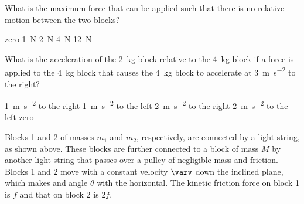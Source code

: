 \documentclass{../../../oss-ap12ibhl}
\begin{document}
\begin{questions}
  \question What is the maximum force that can be applied such that there is no
  relative motion between the two blocks?
  \begin{choices}
    \choice zero
    \choice\SI{1}{\newton}
    \choice\SI{2}{\newton}
    \choice\SI{4}{\newton}
    \choice\SI{12}{\newton}
  \end{choices}
  \label{stacked1}
  
  \question What is the acceleration of the \SI{2}{\kilo\gram} block relative
  to the \SI{4}{\kilo\gram} block if a force is applied to the
  \SI{4}{\kilo\gram} block that causes the \SI{4}{\kilo\gram} block to
  accelerate at \SI{3}{\metre\per\second\squared} to the right?
  \begin{choices}
    \choice\SI{1}{\metre\per\second\squared} to the right
    \choice\SI{1}{\metre\per\second\squared} to the left
    \choice\SI{2}{\metre\per\second\squared} to the right
    \choice\SI{2}{\metre\per\second\squared} to the left
    \choice zero
  \end{choices}
  \label{stacked2}
  \newpage


  \question Blocks 1 and 2 of masses $m_1$ and $m_2$, respectively, are
  connected by a light string, as shown above. These blocks are further
  connected to a block of mass $M$ by another light string that passes over a
  pulley of negligible mass and friction. Blocks 1 and 2 move with a constant
  velocity $\varv$ down the inclined plane, which makes and angle $\theta$ with
  the horizontal. The kinetic friction force on block 1 is $f$ and that on
  block 2 is $2f$.
\end{questions}
\end{document}
